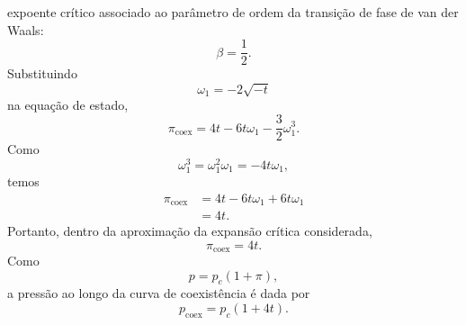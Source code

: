 \documentclass[11pt,a4paper]{article}
\begin{document}
expoente crítico associado ao parâmetro de ordem da transição de fase
de van der Waals:
%
\begin{equation}
    \boxed{\beta=\frac12}.
\end{equation}
%
Substituindo
%
\begin{equation}
    \omega_1=-2\sqrt{-t}
\end{equation}
%
na equação de estado,
%
\begin{equation}
    \pi_{\mathrm{coex}}
    =
    4t
    -6t\omega_1
    -\frac32\omega_1^3.
\end{equation}
%
Como
%
\begin{equation}
    \omega_1^3 = \omega_1^2 \omega_1
    = 
    -4t\omega_1,
\end{equation}
%
temos
%
\begin{align}
    \pi_{\mathrm{coex}}
    &=
    4t
    -6t\omega_1
    +6t\omega_1
    \\
    &=
    4t.
\end{align}
%
Portanto, dentro da aproximação da expansão crítica considerada,
%
\begin{equation}
    \boxed{
    \pi_{\mathrm{coex}}=4t.
    }
    \label{eq:pcoex}
\end{equation}
%
Como
%
\begin{equation}
    p=p_c(1+\pi),
\end{equation}
%
a pressão ao longo da curva de coexistência é dada por
%
\begin{equation}
    \boxed{
    p_{\mathrm{coex}}
    =
    p_c(1+4t).
    }
\end{equation}
\end{document}
